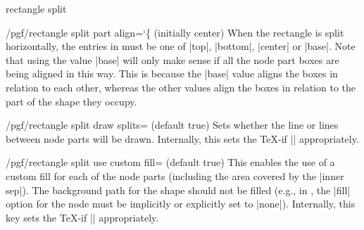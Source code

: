 \begin{shape}{rectangle split}
\begin{key}{/pgf/rectangle split part align={\ttfamily\char`\{} (initially center)}
        When the rectangle is split horizontally, the entries in 
        must be one of |top|, |bottom|, |center| or |base|. Note that using the
        value |base| will only make sense if all the node part boxes are being
        aligned in this way. This is because the |base| value aligns the boxes
        in relation to each other, whereas the other values align the boxes in
        relation to the part of the shape they occupy.
\begin{codeexample}[preamble={\usetikzlibrary{shapes.multipart}}]
\def\x{\Large w\nodepart{two}x\nodepart{three}\Huge y\nodepart{four}\tiny z}
\end{codeexample}
    \end{key}

    \begin{key}{/pgf/rectangle split draw splits= (default true)}
        Sets whether the line or lines between node parts will be drawn.
        Internally, this sets the \TeX-if |\ifpgfrectanglesplitdrawsplits|
        appropriately.
    \end{key}

    \begin{key}{/pgf/rectangle split use custom fill= (default true)}
        This enables the use of a custom fill for each of the node parts
        (including the area covered by the |inner sep|). The background path
        for the shape should not be filled (e.g., in \tikzname{}, the |fill|
        option for the node must be implicitly or explicitly set to |none|).
        Internally, this key sets the \TeX-if
        |\ifpgfrectanglesplitusecustomfill| appropriately.
    \end{key}


\end{shape}
